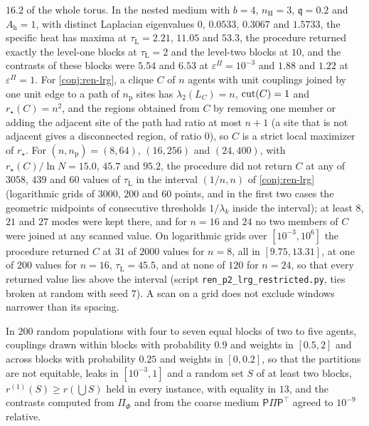 \begin{numcheck}
$16.2$ of the whole torus. In the nested medium with $b=4$, $n_{\mathrm H}=3$, $\mathfrak q=0.2$ and $A_{\mathrm h}=1$, with distinct Laplacian eigenvalues $0$, $0.0533$, $0.3067$ and $1.5733$, the specific heat has maxima at $\tau_{\mathrm L}=2.21$, $11.05$ and $53.3$, the procedure returned exactly the level-one blocks at $\tau_{\mathrm L}=2$ and the level-two blocks at $10$, and the contrasts of these blocks were $5.54$ and $6.53$ at $\varepsilon^\Pi=10^{-3}$ and $1.88$ and $1.22$ at $\varepsilon^\Pi=1$. For \cref{conj:ren-lrg}, a clique $C$ of $n$ agents with unit couplings joined by one unit edge to a path of $n_{\mathrm p}$ sites has $\lambda_2(L_C)=n$, $\operatorname{cut}(C)=1$ and $r_\star(C)=n^2$, and the regions obtained from $C$ by removing one member or adding the adjacent site of the path had ratio at most $n+1$ (a site that is not adjacent gives a disconnected region, of ratio $0$), so $C$ is a strict local maximizer of $r_\star$. For $(n,n_{\mathrm p})=(8,64)$, $(16,256)$ and $(24,400)$, with $r_\star(C)/\ln N=15.0$, $45.7$ and $95.2$, the procedure did not return $C$ at any of $3058$, $439$ and $60$ values of $\tau_{\mathrm L}$ in the interval $(1/n,n)$ of \cref{conj:ren-lrg} (logarithmic grids of $3000$, $200$ and $60$ points, and in the first two cases the geometric midpoints of consecutive thresholds $1/\lambda_k$ inside the interval); at least $8$, $21$ and $27$ modes were kept there, and for $n=16$ and $24$ no two members of $C$ were joined at any scanned value. On logarithmic grids over $[10^{-3},10^6]$ the procedure returned $C$ at $31$ of $2000$ values for $n=8$, all in $[9.75,13.31]$, at one of $200$ values for $n=16$, $\tau_{\mathrm L}=45.5$, and at none of $120$ for $n=24$, so that every returned value lies above the interval (script \texttt{ren\_p2\_lrg\_restricted.py}, ties broken at random with seed $7$). A scan on a grid does not exclude windows narrower than its spacing.
\end{numcheck}

\begin{numcheck}\label{chk:ren-closure}
In $200$ random populations with four to seven equal blocks of two to five agents, couplings drawn within blocks with probability $0.9$ and weights in $[0.5,2]$ and across blocks with probability $0.25$ and weights in $[0,0.2]$, so that the partitions are not equitable, leaks in $[10^{-3},1]$ and a random set $S$ of at least two blocks, $r^{(1)}(S)\ge r(\bigcup S)$ held in every instance, with equality in $13$, and the contrasts computed from $\Pi_\Phi$ and from the coarse medium $\mathsf P\Pi\mathsf P^\top$ agreed to $10^{-9}$ relative.
\end{numcheck}
